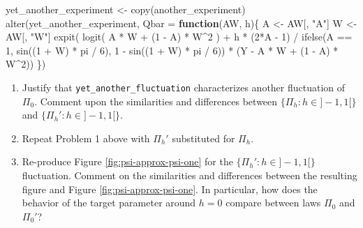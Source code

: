 \documentclass[
  11pt,
  openright,twoside]{book}
\newenvironment{Shaded}{\begin{snugshade}}{\end{snugshade}}
\newcommand{\AttributeTok}[1]{\textcolor[rgb]{0.77,0.63,0.00}{#1}}
\newcommand{\ControlFlowTok}[1]{\textcolor[rgb]{0.13,0.29,0.53}{\textbf{#1}}}
\newcommand{\DecValTok}[1]{\textcolor[rgb]{0.00,0.00,0.81}{#1}}
\newcommand{\FunctionTok}[1]{\textcolor[rgb]{0.00,0.00,0.00}{#1}}
\newcommand{\NormalTok}[1]{#1}
\newcommand{\OtherTok}[1]{\textcolor[rgb]{0.56,0.35,0.01}{#1}}
\newcommand{\SpecialCharTok}[1]{\textcolor[rgb]{0.00,0.00,0.00}{#1}}
\newcommand{\StringTok}[1]{\textcolor[rgb]{0.31,0.60,0.02}{#1}}
\theoremstyle{definition}
\theoremstyle{definition}
\theoremstyle{definition}
\theoremstyle{definition}
\theoremstyle{remark}
\begin{document}
\begin{Shaded}
\begin{Highlighting}[]
\NormalTok{yet\_another\_experiment }\OtherTok{\textless{}{-}} \FunctionTok{copy}\NormalTok{(another\_experiment)}
\FunctionTok{alter}\NormalTok{(yet\_another\_experiment,}
      \AttributeTok{Qbar =} \ControlFlowTok{function}\NormalTok{(AW, h)\{}
\NormalTok{        A }\OtherTok{\textless{}{-}}\NormalTok{ AW[, }\StringTok{"A"}\NormalTok{]}
\NormalTok{        W }\OtherTok{\textless{}{-}}\NormalTok{ AW[, }\StringTok{"W"}\NormalTok{]}
        \FunctionTok{expit}\NormalTok{( }\FunctionTok{logit}\NormalTok{( A }\SpecialCharTok{*}\NormalTok{ W }\SpecialCharTok{+}\NormalTok{ (}\DecValTok{1} \SpecialCharTok{{-}}\NormalTok{ A) }\SpecialCharTok{*}\NormalTok{ W}\SpecialCharTok{\^{}}\DecValTok{2}\NormalTok{ ) }\SpecialCharTok{+} 
\NormalTok{               h }\SpecialCharTok{*}\NormalTok{ (}\DecValTok{2}\SpecialCharTok{*}\NormalTok{A }\SpecialCharTok{{-}} \DecValTok{1}\NormalTok{) }\SpecialCharTok{/} \FunctionTok{ifelse}\NormalTok{(A }\SpecialCharTok{==} \DecValTok{1}\NormalTok{,}
                                      \FunctionTok{sin}\NormalTok{((}\DecValTok{1} \SpecialCharTok{+}\NormalTok{ W) }\SpecialCharTok{*}\NormalTok{ pi }\SpecialCharTok{/} \DecValTok{6}\NormalTok{), }
                                      \DecValTok{1} \SpecialCharTok{{-}} \FunctionTok{sin}\NormalTok{((}\DecValTok{1} \SpecialCharTok{+}\NormalTok{ W) }\SpecialCharTok{*}\NormalTok{ pi }\SpecialCharTok{/} \DecValTok{6}\NormalTok{)) }\SpecialCharTok{*}
\NormalTok{               (Y }\SpecialCharTok{{-}}\NormalTok{ A }\SpecialCharTok{*}\NormalTok{ W }\SpecialCharTok{+}\NormalTok{ (}\DecValTok{1} \SpecialCharTok{{-}}\NormalTok{ A) }\SpecialCharTok{*}\NormalTok{ W}\SpecialCharTok{\^{}}\DecValTok{2}\NormalTok{))}
\NormalTok{      \})}
\end{Highlighting}
\end{Shaded}

\begin{enumerate}
\def\labelenumi{\arabic{enumi}.}
\setcounter{enumi}{2}
\item
  Justify that \texttt{yet\_another\_fluctuation} characterizes another fluctuation of
  \(\Pi_{0}\). Comment upon the similarities and differences between \(\{\Pi_{h} : h \in ]-1,1[\}\) and \(\{\Pi_{h}' : h \in ]-1,1[\}\).
\item
  Repeat Problem 1 above with \(\Pi_{h}'\) substituted for \(\Pi_{h}\).
\item
  Re-produce Figure \ref{fig:psi-approx-psi-one} for the \(\{\Pi_h' : h \in ]-1,1[\}\) fluctuation. Comment on the similarities and differences between
  the resulting figure and Figure \ref{fig:psi-approx-psi-one}. In particular,
  how does the behavior of the target parameter around \(h = 0\) compare between
  laws \(\Pi_0\) and \(\Pi_0'\)?
\end{enumerate}
\end{document}
